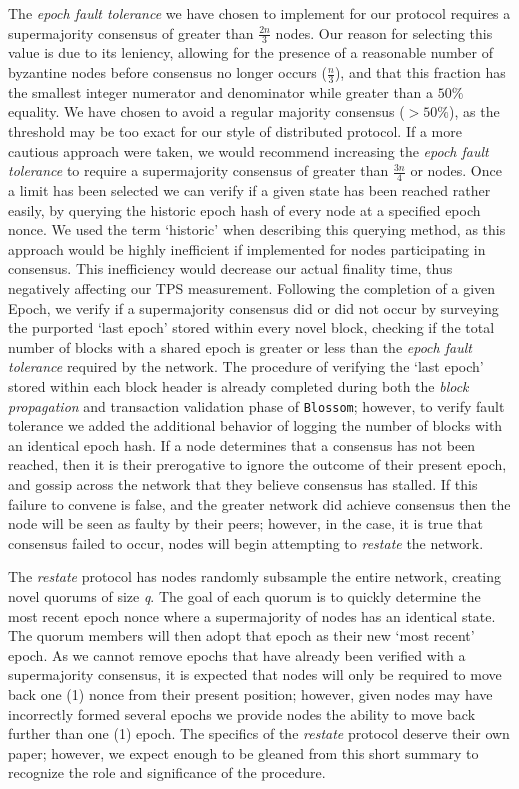 The \textit{epoch fault tolerance} we have chosen to implement for our protocol requires a supermajority consensus of greater than \(\frac{2n}{3}\) nodes. Our reason for selecting this value is due to its leniency, allowing for the presence of a reasonable number of byzantine nodes before consensus no longer occurs (\(\frac{n}{3}\)), and that this fraction has the smallest integer numerator and denominator while greater than a \(50\%\) equality. We have chosen to avoid a regular majority consensus (\(> 50\%\)), as the threshold may be too exact for our style of distributed protocol. If a more cautious approach were taken, we would recommend increasing the \textit{epoch fault tolerance} to require a supermajority consensus of greater than \(\frac{3n}{4}\) or  nodes. Once a limit has been selected we can verify if a given state has been reached rather easily, by querying the historic epoch hash of every node at a specified epoch nonce. We used the term ‘historic’ when describing this querying method, as this approach would be highly inefficient if implemented for nodes participating in consensus. This inefficiency would decrease our actual finality time, thus negatively affecting our TPS measurement. Following the completion of a given Epoch, we verify if a supermajority consensus did or did not occur by surveying the purported ‘last epoch’  stored within every novel block, checking if the total number of blocks with a shared epoch is greater or less than the \textit{epoch fault tolerance} required by the network. The procedure of verifying the ‘last epoch’ stored within each block header is already completed during both the \textit{block propagation} and transaction validation phase of \texttt{Blossom}; however, to verify fault tolerance we added the additional behavior of logging the number of blocks with an identical epoch hash. If a node determines that a consensus has not been reached, then it is their prerogative to ignore the outcome of their present epoch, and gossip across the network that they believe consensus has stalled. If this failure to convene is false, and the greater network did achieve consensus then the node will be seen as faulty by their peers; however, in the case, it is true that consensus failed to occur, nodes will begin attempting to \textit{restate} the network.

The \textit{restate} protocol has nodes randomly subsample the entire network, creating novel quorums of size \textit{q}. The goal of each quorum is to quickly determine the most recent epoch nonce where a supermajority of nodes has an identical state. The quorum members will then adopt that epoch as their new ‘most recent’ epoch. As we cannot remove epochs that have already been verified with a supermajority consensus, it is expected that nodes will only be required to move back one (1) nonce from their present position; however, given nodes may have incorrectly formed several epochs we provide nodes the ability to move back further than one (1) epoch. The specifics of the \textit{restate} protocol deserve their own paper; however, we expect enough to be gleaned from this short summary to recognize the role and significance of the procedure.

